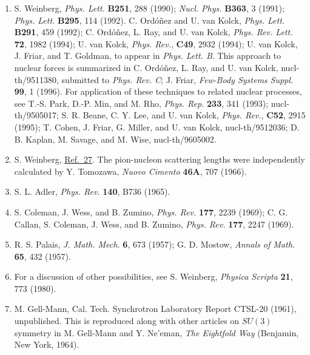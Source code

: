 \begin{enumerate}
\item {}\label{ch19-ref-29}
S. Weinberg, \emph{Phys. Lett.} \textbf{B251}, 288 (1990); \emph{Nucl. Phys.} \textbf{B363}, 3 (1991); \emph{Phys. Lett.} \textbf{B295}, 114 (1992). C. Ord\'o\~nez and U. van Kolck, \emph{Phys. Lett.} \textbf{B291}, 459 (1992); C. Ord\'o\~nez, L. Ray, and U. van Kolck, \emph{Phys. Rev. Lett.} \textbf{72}, 1982 (1994); U. van Kolck, \emph{Phys. Rev.}, \textbf{C49}, 2932 (1994); U. van Kolck, J. Friar, and T. Goldman, to appear in \emph{Phys. Lett. B}. This approach to nuclear forces is summarized in C. Ord\'o\~nez, L. Ray, and U. van Kolck, nucl-th/9511380, submitted to \emph{Phys. Rev. C}; J. Friar, \emph{Few-Body Systems Suppl.} \textbf{99}, 1 (1996). For application of these techniques to related nuclear processes, see T.-S. Park, D.-P. Min, and M. Rho, \emph{Phys. Rep.} \textbf{233}, 341 (1993); nucl-th/9505017; S. R. Beane, C. Y. Lee, and U. van Kolck, \emph{Phys. Rev.}, \textbf{C52}, 2915 (1995); T. Cohen, J. Friar, G. Miller, and U. van Kolck, nucl-th/9512036; D. B. Kaplan, M. Savage, and M. Wise, nucl-th/9605002.

\item {}\label{ch19-ref-30}
S. Weinberg, \hyperref[ch19-ref-27]{Ref.~27}. The pion-nucleon scattering lengths were independently calculated by Y. Tomozawa, \emph{Nuovo Cimento} \textbf{46A}, 707 (1966).

\item[30a.] \label{ch19-ref-30a}
S. L. Adler, \emph{Phys. Rev.} \textbf{140}, B736 (1965).

\item {}\label{ch19-ref-31}
S. Coleman, J. Wess, and B. Zumino, \emph{Phys. Rev.} \textbf{177}, 2239 (1969); C. G. Callan, S. Coleman, J. Wess, and B. Zumino, \emph{Phys. Rev.} \textbf{177}, 2247 (1969).

\item {}\label{ch19-ref-32}
R. S. Palais, \emph{J. Math. Mech.} \textbf{6}, 673 (1957); G. D. Mostow, \emph{Annals of Math.} \textbf{65}, 432 (1957).

\item[32a.] \label{ch19-ref-32a}
For a discussion of other possibilities, see S. Weinberg, \emph{Physica Scripta} \textbf{21}, 773 (1980).

\item {}\label{ch19-ref-33}
M. Gell-Mann, Cal. Tech. Synchrotron Laboratory Report CTSL-20 (1961), unpublished. This is reproduced along with other articles on $SU(3)$ symmetry in M. Gell-Mann and Y. Ne'eman, \emph{The Eightfold Way} (Benjamin, New York, 1964).


\end{enumerate}
